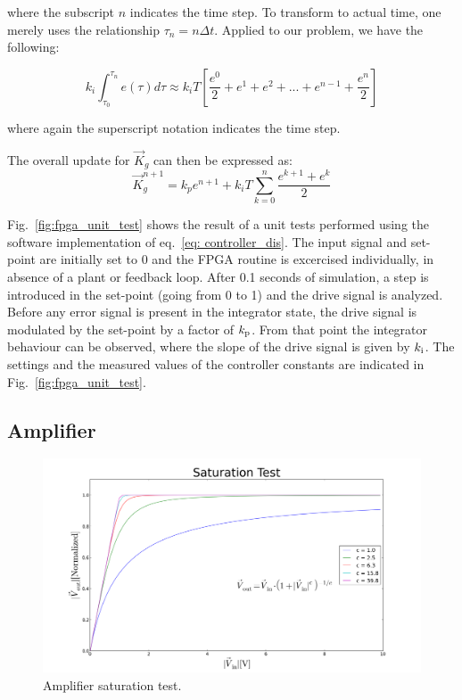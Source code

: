 \documentclass[a4paper,12pt]{article}
\newcommand{\be}{\begin{equation}}
\newcommand{\ee}{\end{equation}}
\begin{document}
\noindent where the subscript $n$ indicates the time step. To transform to actual time, one merely uses the relationship $\tau_{n} = n\Delta t$. Applied to our problem, we have the following: 

\be
k_{i} \int_{\tau_{0}}^{\tau_{n}} e(\tau)d\tau \approx k_{i}T
	      \left[\frac{e^{0}}{2} + e^{1} + e^{2} + ... 
		+ e^{n-1} + \frac{e^{n}}{2} \right]
\ee

\noindent where again the superscript notation indicates the time step. 

The overall update for $\vec{K}_{g}$ can then be expressed as:
\be \label{eq: controller_dis}
\vec{K}_{g}^{n+1} = k_{p} e^{n+1} + k_{i}T \sum_{k=0}^{n}\frac{e^{k+1}+e^k}{2}
\ee

Fig.~\ref{fig:fpga_unit_test} shows the result of a unit tests performed using the software implementation of eq.~\ref{eq: controller_dis}. The input signal and set-point are initially set to 0 and the FPGA routine is excercised individually, in absence of a plant or feedback loop. After 0.1 seconds of simulation, a step is introduced in the set-point (going from 0 to 1) and the drive signal is analyzed. Before any error signal is present in the integrator state, the drive signal is modulated by the set-point by a factor of $k_{\rm p}$. From that point the integrator behaviour can be observed, where the slope of the drive signal is given by $k_{\rm i}$. The settings and the measured values of the controller constants are indicated in Fig.~\ref{fig:fpga_unit_test}. 

\subsection{Amplifier}

\begin{figure}
\centering
\includegraphics[scale=0.35]{../figures/saturation_test.png}
\caption{Amplifier saturation test.}
\label{fig:saturation_test}
\end{figure}
\end{document}
